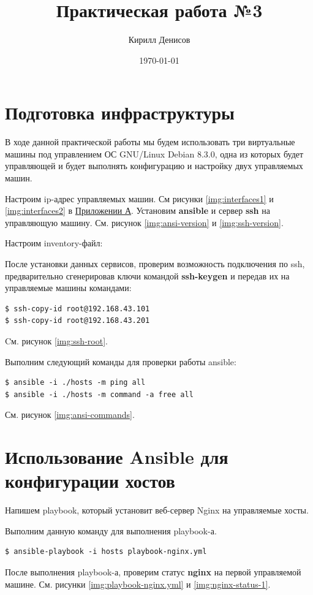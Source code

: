 \documentclass[a4paper,14pt]{extarticle}
\author{Кирилл Денисов}
\title{Практическая работа №3}
\date{\today}
\newcommand{\pathToCommonFolder}{/home/denilai/Documents/repos/latex/Common}
\begin{document}
	\thispagestyle{empty}
	
	
	
	\newpage
	\tableofcontents
	\newpage

\section{Подготовка инфраструктуры}
В ходе данной практической работы мы будем использовать три виртуальные машины под управлением ОС GNU/Linux Debian 8.3.0, одна из которых будет управляющей и будет выполнять конфигурацию и настройку двух управляемых машин.

Настроим ip-адрес управляемых машин. См рисунки \ref{img:interfaces1} и \ref{img:interfaces2} в \hyperref[A]{Приложении А}.
Установим \textbf{ansible} и сервер \textbf{ssh} на управляющую машину. См. рисунок \ref{img:ansi-version} и \ref{img:ssh-version}.

Настроим inventory-файл:


После установки данных сервисов, проверим возможность подключения по ssh, предварительно сгенерировав ключи командой \textbf{ssh-keygen} и передав их на управляемые машины командами:
\begin{lstlisting}
$ ssh-copy-id root@192.168.43.101
$ ssh-copy-id root@192.168.43.201
\end{lstlisting}
Cм. рисунок \ref{img:ssh-root}.

Выполним следующий команды для проверки работы ansible:
\begin{lstlisting}
$ ansible -i ./hosts -m ping all
$ ansible -i ./hosts -m command -a free all
\end{lstlisting}
См. рисунок \ref{img:ansi-commands}.

\section{Использование Ansible для конфигурации хостов}

Напишем playbook, который установит веб-сервер Nginx на управляемые хосты.


Выполним данную команду для выполнения playbook-а.
\begin{lstlisting}
$ ansible-playbook -i hosts playbook-nginx.yml
\end{lstlisting}


После выполнения playbook-а, проверим статус \textbf{nginx} на первой управляемой машине. См. рисунки \ref{img:playbook-nginx.yml} и \ref{img:nginx-status-1}.
\end{document}
